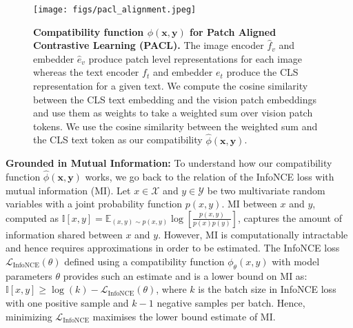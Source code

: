 \documentclass[10pt,twocolumn,letterpaper]{article}
\begin{document}
\begin{figure*}[!t]
\centering
    \texttt{[image: figs/pacl\_alignment.jpeg]}
    \caption{\textbf{Compatibility function $\phi(\mathbf{x}, \mathbf{y})$ for Patch Aligned Contrastive Learning (PACL).} The image encoder $\hat{f}_v$ and embedder $\hat{e}_v$ produce patch level representations for each image whereas the text encoder $f_t$ and embedder $e_t$ produce the CLS representation for a given text. We compute the cosine similarity between the CLS text embedding and the vision patch embeddings and use them as weights to take a weighted sum over vision patch tokens. We use the cosine similarity between the weighted sum and the CLS text token as our compatibility $\hat{\phi}(\mathbf{x}, \mathbf{y})$.}
    \vspace{-4mm}
    \label{fig:pacl_compatibility_function}
\end{figure*}

\textbf{Grounded in Mutual Information: } To understand how our compatibility function $\hat{\phi}(\mathbf{x}, \mathbf{y})$ works, we go back to the relation of the InfoNCE \cite{oord2018representation} loss with mutual information (MI). Let $x \in \mathcal{X}$ and $y \in \mathcal{Y}$ be two multivariate random variables with a joint probability function $p(x, y)$. MI between $x$ and $y$, computed as $\mathbb{I}[x, y] = \mathbb{E}_{(x, y) \sim p(x, y)}\log \left[\frac{p(x, y)}{p(x)p(y)}\right]$, captures the amount of information shared between $x$ and $y$. However, MI is computationally intractable and hence requires approximations in order to be estimated. The InfoNCE loss $\mathcal{L}_{\mathrm{InfoNCE}}(\theta)$ defined using a compatibility function $\phi_{\theta}(x, y)$ with model parameters $\theta$ provides such an estimate and is a lower bound on MI as: $\mathbb{I}[x, y] \geq \log(k) - \mathcal{L}_{\mathrm{InfoNCE}}(\theta)$, where $k$ is the batch size in InfoNCE loss with one positive sample and $k-1$ negative samples per batch. Hence, minimizing $\mathcal{L}_{\mathrm{InfoNCE}}$ maximises the lower bound estimate of MI.
\end{document}

